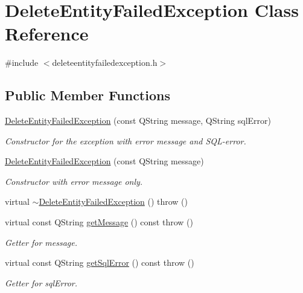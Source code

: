 \hypertarget{classDeleteEntityFailedException}{
\section{\-Delete\-Entity\-Failed\-Exception \-Class \-Reference}
\label{db/d17/classDeleteEntityFailedException}
}


{\ttfamily \#include $<$deleteentityfailedexception.\-h$>$}

\subsection*{\-Public \-Member \-Functions}
\begin{DoxyCompactItemize}
\item 
\hyperlink{classDeleteEntityFailedException_a56ddfb0781924aecdb0417ad24ed5cbd}{\-Delete\-Entity\-Failed\-Exception} (const \-Q\-String message, \-Q\-String sql\-Error)
\begin{DoxyCompactList}\small\item\em \-Constructor for the exception with error message and \-S\-Q\-L-\/error. \end{DoxyCompactList}\item 
\hyperlink{classDeleteEntityFailedException_a26e4c2fde7ae3228069c9ee0c497e66f}{\-Delete\-Entity\-Failed\-Exception} (const \-Q\-String message)
\begin{DoxyCompactList}\small\item\em \-Constructor with error message only. \end{DoxyCompactList}\item 
virtual \hyperlink{classDeleteEntityFailedException_ad1e0c9bb196256e7aceb88392950e748}{$\sim$\-Delete\-Entity\-Failed\-Exception} ()  throw ()
\item 
virtual const \-Q\-String \hyperlink{classDeleteEntityFailedException_a7167d2e97fbd6ac16dcccf737bb62429}{get\-Message} () const   throw ()
\begin{DoxyCompactList}\small\item\em \-Getter for message. \end{DoxyCompactList}\item 
virtual const \-Q\-String \hyperlink{classDeleteEntityFailedException_ac1716fe6e0b2173d59556e0b6f1b3262}{get\-Sql\-Error} () const   throw ()
\begin{DoxyCompactList}\small\item\em \-Getter for sql\-Error. \end{DoxyCompactList}\end{DoxyCompactItemize}


